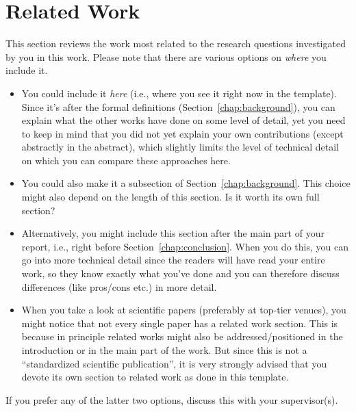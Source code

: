 \chapter{Related Work}\label{chap:relatedWork}

This section reviews the work most related to the research questions investigated by you in this work. Please note that there are various options on \emph{where} you include it.

\begin{itemize}
  \item You could include it \emph{here} (i.e., where you see it right now in the template). Since it's after the formal definitions (Section~\ref{chap:background}), you can explain what the other works have done on some level of detail, yet you need to keep in mind that you did not yet explain your own contributions (except abstractly in the abstract), which slightly limits the level of technical detail on which you can compare these approaches here.
  
  \item You could also make it a subsection of Section~\ref{chap:background}. This choice might also depend on the length of this section. Is it worth its own full section?

  \item Alternatively, you might include this section after the main part of your report, i.e., right before Section~\ref{chap:conclusion}. When you do this, you can go into more technical detail since the readers will have read your entire work, so they know exactly what you've done and you can therefore discuss differences (like pros/cons etc.) in more detail.

  \item When you take a look at scientific papers (preferably at top-tier venues), you might notice that not every single paper has a related work section. This is because in principle related works might also be addressed/positioned in the introduction or in the main part of the work. But since this is not a ``standardized scientific publication'', it is very strongly advised that you devote its own section to related work as done in this template.
\end{itemize}

If you prefer any of the latter two options, discuss this with your supervisor(s).

